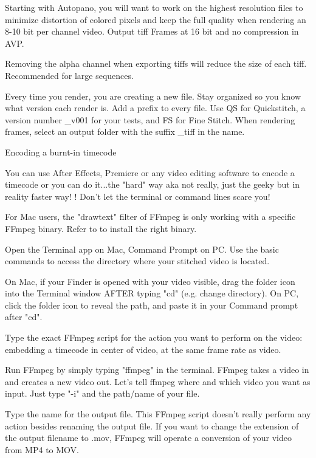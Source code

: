 \begin{fullwidth}
Starting with Autopano, you will want to work on the highest resolution files to minimize distortion of colored pixels and keep the full quality when rendering an 8-10 bit per channel video. Output tiff Frames at 16 bit and no compression in AVP.


\tip Removing the alpha channel when exporting tiffs will reduce the size of each tiff. Recommended for large sequences.

Every time you render, you are creating a new file. Stay organized so you know what version each render is. Add a prefix to every file. Use QS for Quickstitch, a version number \_v001 for your tests, and FS for Fine Stitch. When rendering frames, select an output folder with the suffix \_tiff in the name.

{\large Encoding a burnt-in timecode \par}

You can use After Effects, Premiere or any video editing software to encode a timecode or you can do it...the "hard" way aka not really, just the geeky but in reality faster way! \textbf{}! Don't let the terminal or command lines scare you!

For Mac users, the "drawtext" filter of FFmpeg is only working with a specific FFmpeg binary. Refer to \textbf{} to install the right binary.

Open the Terminal app on Mac, Command Prompt on PC. Use the basic commands to access the directory where your stitched video is located.


\tip On Mac, if your Finder is opened with your video visible, drag the folder icon into the Terminal window AFTER typing "cd" (e.g. change directory). On PC, click the folder icon to reveal the path, and paste it in your Command prompt after "cd".

Type the exact FFmpeg script for the action you want to perform on the video: embedding a timecode in center of video, at the same frame rate as video.

Run FFmpeg by simply typing "ffmpeg" in the terminal. FFmpeg takes a video in and creates a new video out. Let's tell ffmpeg where and which video you want as input. Just type "-i" and the path/name of your file.


Type the name for the output file. This FFmpeg script doesn't really perform any action besides renaming the output file. If you want to change the extension of the output filename to .mov, FFmpeg will operate a conversion of your video from MP4 to MOV.


\end{fullwidth}

